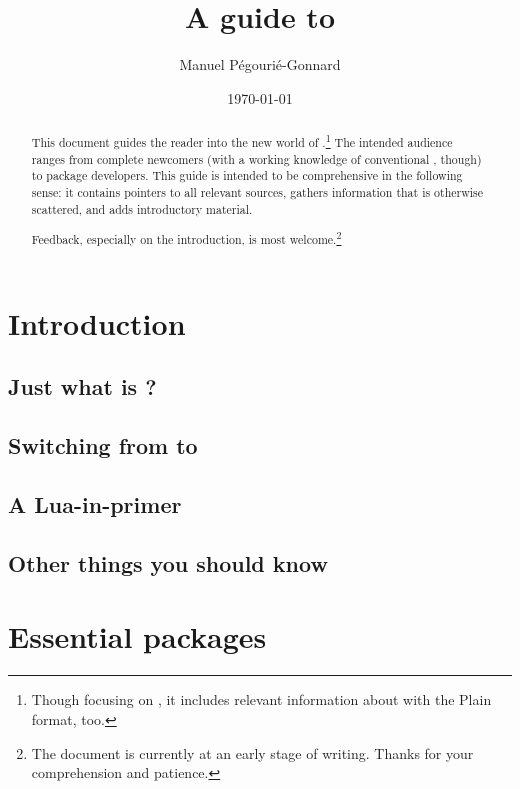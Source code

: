 \documentclass{lltxdoc}
\title{A guide to \lualatex}
\author{Manuel Pégourié-Gonnard \\ \email{mpg@elzevir.fr}}
\date{\today}
\begin{document}
\maketitle

\begin{abstract}
  This document guides the reader into the new world of
  \lualatex.\footnote{Though focusing on \lualatex, it includes relevant
    information about \luatex with the Plain format, too.} The intended
  audience ranges from complete newcomers (with a working knowledge of
  conventional \latex, though) to package developers. This guide is
  intended to be comprehensive in the following sense: it contains pointers to
  all relevant sources, gathers information that is otherwise scattered,
  and adds introductory material.

  Feedback, especially on the introduction, is most welcome.\footnote{The
    document is currently at an early stage of writing.  Thanks for your
    comprehension and patience.}
\end{abstract}

\setcounter{tocdepth}{2}
\tableofcontents
\clearpage

\section{Introduction}\label{intro}

\subsection{Just what is \lualatex?}\label{what}

\subsection{Switching from \latex to \lualatex}\label{switch}

\subsection{A Lua-in-\tex primer}\label{luaintex}

\subsection{Other things you should know}\label{misc}

\section{Essential packages}\label{essential}
\end{document}
